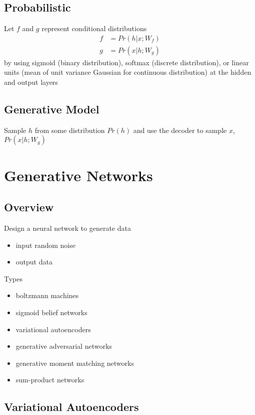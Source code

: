 \documentclass[]{article}
\theoremstyle{definition}
\begin{document}
\subsection{Probabilistic}
\label{sub:probabilistic}
Let $f$ and $g$ represent conditional distributions
\begin{align*}
    f &= Pr(h | x; W_f) \\
    g &= Pr(x | h; W_g)
\end{align*}
by using sigmoid (binary distribution), softmax (discrete distribution), or linear units 
(mean of unit variance Gaussian for continuous distribution) at the hidden and output layers

\subsection{Generative Model}
\label{sub:generative_model}

Sample $h$ from some distribution $Pr(h)$ and use the decoder to sample $x$, $Pr(x | h; W_g)$

\section{Generative Networks}
\label{sec:generative_networks}

\subsection{Overview}
\label{sub:overview}
Design a neural network to generate data
\begin{itemize}
    \item input random noise
    \item output data
\end{itemize}

Types
\begin{itemize}
    \item boltzmann machines
    \item sigmoid belief networks
    \item variational autoencoders
    \item generative adversarial networks
    \item generative moment matching networks
    \item sum-product networks
\end{itemize}


\subsection{Variational Autoencoders}
\label{sub:variational_autoencoders}
\end{document}
